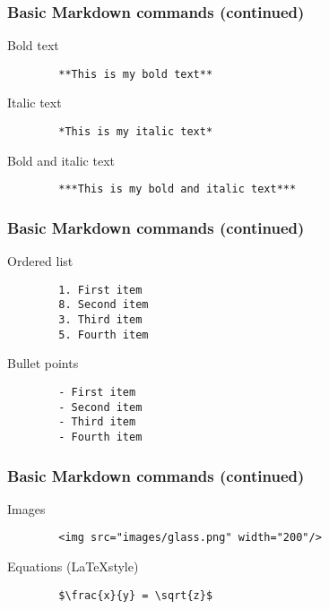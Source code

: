 \documentclass{beamer}
\begin{document}
	\begin{frame}[fragile]
	\frametitle{Basic Markdown commands (continued)}
	Bold text
	\begin{exampleblock}{}
		\begin{verbatim}
		**This is my bold text**
		\end{verbatim}
	\end{exampleblock}

	\vspace{0.5cm}

	Italic text
	\begin{exampleblock}{}
		\begin{verbatim}
		*This is my italic text*
		\end{verbatim}
	\end{exampleblock}

	\vspace{0.5cm}

	Bold and italic text
	\begin{exampleblock}{}
		\begin{verbatim}
		***This is my bold and italic text***
		\end{verbatim}
	\end{exampleblock}
	\end{frame}

	\begin{frame}[fragile]
	\frametitle{Basic Markdown commands (continued)}
	Ordered list
	\begin{exampleblock}{}
		\begin{verbatim}
		1. First item
		8. Second item
		3. Third item
		5. Fourth item
		\end{verbatim}
	\end{exampleblock}

	\vspace{0.5cm}

	Bullet points
	\begin{exampleblock}{}
		\begin{verbatim}
		- First item
		- Second item
		- Third item
		- Fourth item
		\end{verbatim}
	\end{exampleblock}
	\end{frame}

	\begin{frame}[fragile]
	\frametitle{Basic Markdown commands (continued)}
	Images
	\begin{exampleblock}{}
		\begin{verbatim}
		<img src="images/glass.png" width="200"/>
		\end{verbatim}
	\end{exampleblock}

	\vspace{0.5cm}

	Equations (\LaTeX style)
	\begin{exampleblock}{}
		\begin{verbatim}
		$\frac{x}{y} = \sqrt{z}$
		\end{verbatim}
	\end{exampleblock}
	\end{frame}
\end{document}
